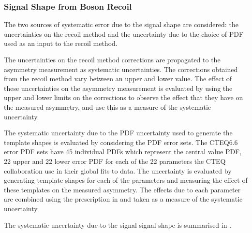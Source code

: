 \subsubsection{Signal \ETm Shape from Boson Recoil}
The two sources of systematic error due to the signal \ETm shape are considered:
the uncertainties on the recoil method and the uncertainty due to the choice of
PDF used as an input to the recoil method.

The uncertainties on the recoil method corrections are propagated to the
asymmetry measurement as systematic uncertainties.  The corrections obtained
from the recoil method vary between an upper and lower
value\cite{bauer2010modeling}. The effect of these uncertainties on the
asymmetry measurement is evaluated by using the upper and lower limits on the
corrections to observe the effect that they have on the measured asymmetry, and
use this as a measure of the systematic uncertainty.

The systematic uncertainty due to the {PDF} uncertainty used to generate the
template shapes is evaluated by considering the {PDF} error sets. The
CTEQ6.6\cite{lai2010vv} error {PDF} sets have 45 individual PDFs which represent
the central value {PDF}, 22 upper and 22 lower error {PDF} for each of the 22
parameters the CTEQ collaboration use in their global fits to data.  The
uncertainty is evaluated by generating template shapes for each of the
parameters and measuring the effect of these templates on the measured
asymmetry. The effects due to each parameter are combined using the
prescription in  and taken as a measure of the
systematic uncertainty.

The systematic uncertainty due to the signal \ETm signal shape is summarised in
.

